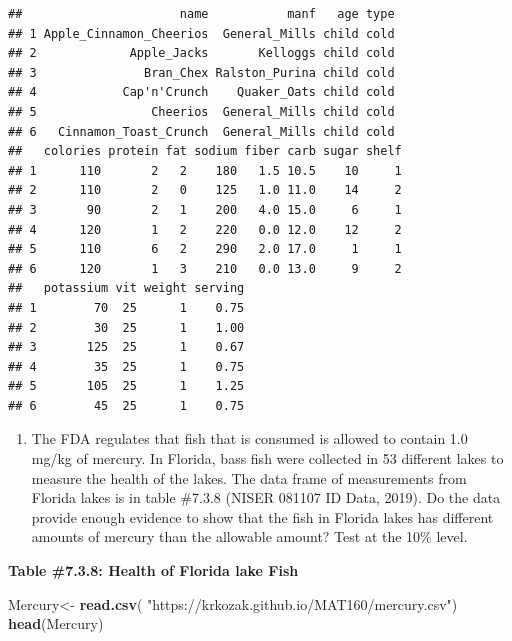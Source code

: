 \documentclass[
]{book}
\newenvironment{Shaded}{\begin{snugshade}}{\end{snugshade}}
\newcommand{\KeywordTok}[1]{\textcolor[rgb]{0.13,0.29,0.53}{\textbf{#1}}}
\newcommand{\NormalTok}[1]{#1}
\newcommand{\StringTok}[1]{\textcolor[rgb]{0.31,0.60,0.02}{#1}}
\providecommand{\tightlist}{%
  \setlength{\itemsep}{0pt}\setlength{\parskip}{0pt}}
\begin{document}
\begin{verbatim}
##                      name           manf   age type
## 1 Apple_Cinnamon_Cheerios  General_Mills child cold
## 2             Apple_Jacks       Kelloggs child cold
## 3               Bran_Chex Ralston_Purina child cold
## 4            Cap'n'Crunch    Quaker_Oats child cold
## 5                Cheerios  General_Mills child cold
## 6   Cinnamon_Toast_Crunch  General_Mills child cold
##   colories protein fat sodium fiber carb sugar shelf
## 1      110       2   2    180   1.5 10.5    10     1
## 2      110       2   0    125   1.0 11.0    14     2
## 3       90       2   1    200   4.0 15.0     6     1
## 4      120       1   2    220   0.0 12.0    12     2
## 5      110       6   2    290   2.0 17.0     1     1
## 6      120       1   3    210   0.0 13.0     9     2
##   potassium vit weight serving
## 1        70  25      1    0.75
## 2        30  25      1    1.00
## 3       125  25      1    0.67
## 4        35  25      1    0.75
## 5       105  25      1    1.25
## 6        45  25      1    0.75
\end{verbatim}

\begin{enumerate}
\def\labelenumi{\arabic{enumi}.}
\setcounter{enumi}{2}
\tightlist
\item
  The FDA regulates that fish that is consumed is allowed to contain 1.0 mg/kg of mercury. In Florida, bass fish were collected in 53 different lakes to measure the health of the lakes. The data frame of measurements from Florida lakes is in table \#7.3.8 (NISER 081107 ID Data, 2019). Do the data provide enough evidence to show that the fish in Florida lakes has different amounts of mercury than the allowable amount? Test at the 10\% level.
\end{enumerate}

\textbf{Table \#7.3.8: Health of Florida lake Fish}

\begin{Shaded}
\begin{Highlighting}[]
\NormalTok{Mercury<-}\StringTok{ }\KeywordTok{read.csv}\NormalTok{(}
  \StringTok{"https://krkozak.github.io/MAT160/mercury.csv"}\NormalTok{)}
\KeywordTok{head}\NormalTok{(Mercury)}
\end{Highlighting}
\end{Shaded}
\end{document}
